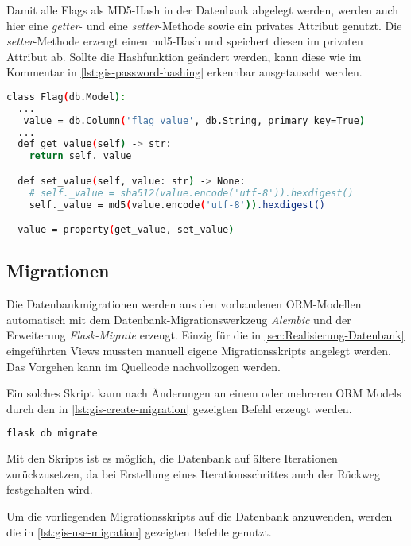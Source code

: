 Damit alle Flags als MD5-Hash in der Datenbank abgelegt werden, werden auch hier eine \textit{getter}- und eine \textit{setter}-Methode sowie ein privates Attribut genutzt. Die \textit{setter}-Methode erzeugt einen md5-Hash und speichert diesen im privaten Attribut ab. Sollte die Hashfunktion geändert werden, kann diese wie im Kommentar in \autoref{lst:gis-password-hashing} erkennbar ausgetauscht werden.

\begin{lstlisting}[language=bash, frame=single, caption={GIS Hashen der Flags}, captionpos=b, label={lst:gis-password-hashing}]
class Flag(db.Model):
  ...
  _value = db.Column('flag_value', db.String, primary_key=True)
  ...
  def get_value(self) -> str:
    return self._value

  def set_value(self, value: str) -> None:
    # self._value = sha512(value.encode('utf-8')).hexdigest()
    self._value = md5(value.encode('utf-8')).hexdigest()

  value = property(get_value, set_value)
\end{lstlisting}

\subsection{Migrationen}\label{sub:realisierung-migration}

Die Datenbankmigrationen werden aus den vorhandenen ORM-Modellen automatisch mit dem Datenbank-Migrationswerkzeug \textit{Alembic} und der Erweiterung \textit{Flask-Migrate} erzeugt. Einzig für die in \autoref{sec:Realisierung-Datenbank} eingeführten Views mussten manuell eigene Migrationsskripts angelegt werden. Das Vorgehen kann im Quellcode nachvollzogen werden.

Ein solches Skript kann nach Änderungen an einem oder mehreren ORM Models durch den in \ref{lst:gis-create-migration} gezeigten Befehl erzeugt werden.

\begin{lstlisting}[language=bash, frame=single, caption={GIS Erzeugung eines Migrationsskripts}, captionpos=b, label={lst:gis-create-migration}]
flask db migrate
\end{lstlisting}

Mit den Skripts ist es möglich, die Datenbank auf ältere Iterationen zurückzusetzen, da bei Erstellung eines Iterationsschrittes auch der Rückweg festgehalten wird.

Um die vorliegenden Migrationsskripts auf die Datenbank anzuwenden, werden die in \autoref{lst:gis-use-migration} gezeigten Befehle genutzt.

